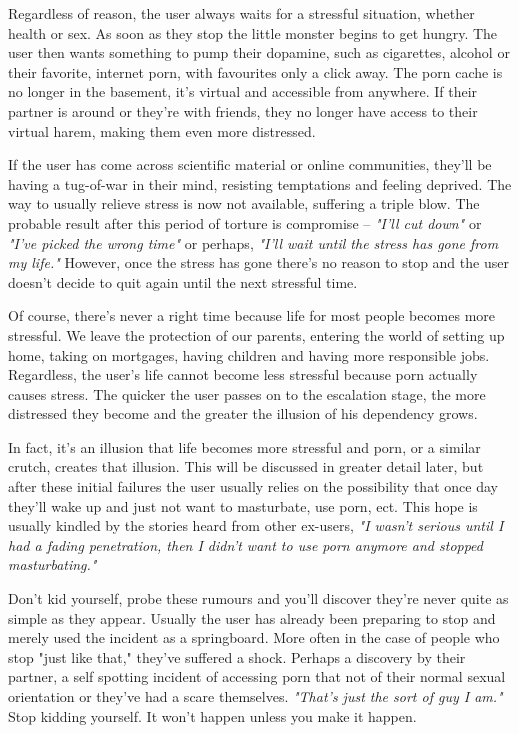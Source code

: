 \documentclass[easypeasy.tex]{subfiles}
\begin{document}
Regardless of reason, the user always waits for a stressful situation, whether health or sex. As soon as they stop the little monster begins to get hungry. The user then wants something to pump their dopamine, such as cigarettes, alcohol or their favorite, internet porn, with favourites only a click away. The porn cache is no longer in the basement, it's virtual and accessible from anywhere. If their partner is around or they're with friends, they no longer have access to their virtual harem, making them even more distressed.

If the user has come across scientific material or online communities, they'll be having a tug-of-war in their mind, resisting temptations and feeling deprived. The way to usually relieve stress is now not available, suffering a triple blow. The probable result after this period of torture is compromise -- \textit{"I'll cut down"} or \textit{"I've picked the wrong time"} or perhaps, \textit{"I'll wait until the stress has gone from my life."} However, once the stress has gone there's no reason to stop and the user doesn't decide to quit again until the next stressful time.

Of course, there's never a right time because life for most people becomes more stressful. We leave the protection of our parents, entering the world of setting up home, taking on mortgages, having children and having more responsible jobs. Regardless, the user's life cannot become less stressful because porn actually causes stress. The quicker the user passes on to the escalation stage, the more distressed they become and the greater the illusion of his dependency grows.

In fact, it's an illusion that life becomes more stressful and porn, or a similar crutch, creates that illusion. This will be discussed in greater detail later, but after these initial failures the user usually relies on the possibility that once day they'll wake up and just not want to masturbate, use porn, ect. This hope is usually kindled by the stories heard from other ex-users, \textit{"I wasn't serious until I had a fading penetration, then I didn't want to use porn anymore and stopped masturbating."}

Don't kid yourself, probe these rumours and you'll discover they're never quite as simple as they appear. Usually the user has already been preparing to stop and merely used the incident as a springboard. More often in the case of people who stop "just like that," they've suffered a shock. Perhaps a discovery by their partner, a self spotting incident of accessing porn that not of their normal sexual orientation or they've had a scare themselves. \textit{"That's just the sort of guy I am."} Stop kidding yourself. It won't happen unless you make it happen.
\end{document}
